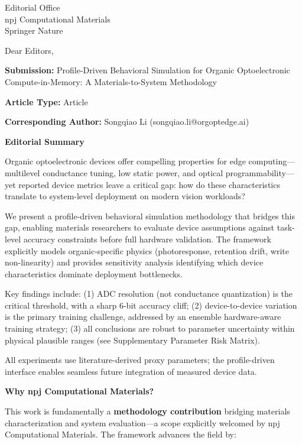 \documentclass[11pt,a4paper]{letter}
\begin{document}
\begin{letter}{Editorial Office\\npj Computational Materials\\Springer Nature}

\opening{Dear Editors,}

\textbf{Submission:} Profile-Driven Behavioral Simulation for Organic Optoelectronic Compute-in-Memory: A Materials-to-System Methodology

\textbf{Article Type:} Article

\textbf{Corresponding Author:} Songqiao Li (songqiao.li@orgoptedge.ai)

\vspace{0.5em}
\textbf{Editorial Summary}

Organic optoelectronic devices offer compelling properties for edge computing---multilevel conductance tuning, low static power, and optical programmability---yet reported device metrics leave a critical gap: how do these characteristics translate to system-level deployment on modern vision workloads? 

We present a profile-driven behavioral simulation methodology that bridges this gap, enabling materials researchers to evaluate device assumptions against task-level accuracy constraints before full hardware validation. The framework explicitly models organic-specific physics (photoresponse, retention drift, write non-linearity) and provides sensitivity analysis identifying which device characteristics dominate deployment bottlenecks.

Key findings include: (1) ADC resolution (not conductance quantization) is the critical threshold, with a sharp 6-bit accuracy cliff; (2) device-to-device variation is the primary training challenge, addressed by an ensemble hardware-aware training strategy; (3) all conclusions are robust to parameter uncertainty within physical plausible ranges (see Supplementary Parameter Risk Matrix).

All experiments use literature-derived proxy parameters; the profile-driven interface enables seamless future integration of measured device data.

\vspace{0.5em}
\textbf{Why npj Computational Materials?}

This work is fundamentally a \textbf{methodology contribution} bridging materials characterization and system evaluation---a scope explicitly welcomed by npj Computational Materials. The framework advances the field by:


\end{letter}
\end{document}
